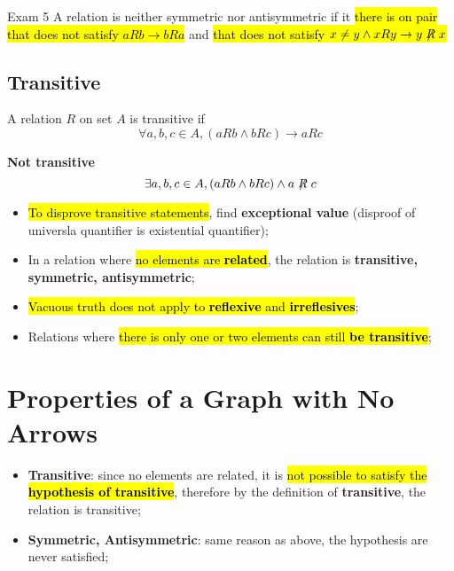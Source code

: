 \documentclass{note}
\begin{document}
\begin{note}{Exam 5}
	A relation is neither symmetric nor antisymmetric if it \hl{there is on pair that does not satisfy $ a R b \to b R a $} and \hl{that does
	not satisfy $ x \neq y \wedge x R y \to y \not \mathrel{R} x $}

        \subsection{Transitive}

        A relation $ R $ on set $ A $ is transitive if
        \begin{displaymath}
            \forall a,b,c \in A, \left( a R b \wedge b R c \right) \to a R c
        \end{displaymath}

        \textbf{Not transitive}
        \begin{displaymath}
            \exists a,b,c \in A, \left( a R b \wedge b R c \right) \wedge a \not \mathrel{R} c
        \end{displaymath}

        \begin{itemize}
            \item \hl{To disprove transitive statements}, find \textbf{exceptional value} (disproof of universla quantifier
            is existential quantifier);

            \item In a relation where \hl{no elements are \textbf{related}}, the relation is \textbf{transitive,
            symmetric, antisymmetric};
            \item \hl{Vacuous truth does not apply to \textbf{reflexive} and \textbf{irreflesives}};
            \item Relations where \hl{there is only one or two elements can still \textbf{be transitive}};
        \end{itemize}

	\section{Properties of a Graph with No Arrows}

	\begin{itemize}
	    \item \textbf{Transitive}: since no elements are related, it is \hl{not possible to satisfy the \textbf{hypothesis of transitive}},
	    therefore by the definition of \textbf{transitive}, the relation is transitive;

	    \item \textbf{Symmetric, Antisymmetric}: same reason as above, the hypothesis are never satisfied;


\end{itemize}
\end{note}
\end{document}
